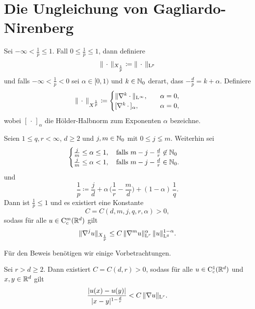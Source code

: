 \chapter{Die Ungleichung von Gagliardo-Nirenberg}

\begin{ntion}
  Sei $-\infty < \frac{1}{p} \leq 1$.
  Fall $0 \leq \frac{1}{p} \leq 1$, dann definiere
  $$
  \| \,\cdot\, \|_{X_{\frac{1}{p}}} \coloneqq \| \,\cdot\, \|_{\mathrm{L}^p}
  $$
  und falls $-\infty < \frac{1}{p} < 0$ sei $\alpha \in [0,1)$ und $k \in \mathbb{N}_0$ derart, dass $-\frac{d}{p} = k + \alpha$. Definiere
  $$
  \| \,\cdot\, \|_{X^{\frac{1}{p}}} \coloneqq 
  \begin{cases} 
    \| \nabla^k \cdot \|_{\mathrm{L}^\infty}, \quad &\alpha = 0, \\ [ \nabla^k \, \cdot \, ]_\alpha, \quad &\alpha = 0,
  \end{cases}
  $$
  wobei $[\,\cdot\,]_\alpha$ die Hölder-Halbnorm zum Exponenten $\alpha$ bezeichne.
\end{ntion}

\begin{hsatz}
  \label{hsatz:gagliardoNirenberg}
  Seien $1 \leq q,r < \infty$, $d \geq 2$ und $j,m \in \mathbb{N}_0$ mit $0 \leq j \lneq m$.
  Weiterhin sei
  $$
  \begin{cases}
    \frac{j}{m} \leq \alpha \leq 1, \quad \text{falls } m - j - \frac{d}{r} \not\in \mathbb{N}_0 \\
    \frac{j}{m} \leq \alpha < 1, \quad \text{falls } m - j - \frac{d}{r} \in \mathbb{N}_0.
  \end{cases}
    $$
    und
    $$
    \frac{1}{p} \coloneqq \frac{j}{d} + \alpha\, \Big( \frac{1}{r} - \frac{m}{d} \Big) + (1 - \alpha) \, \frac{1}{q}.
    $$
    Dann ist $\frac{1}{p} \leq 1$ und es existiert eine Konstante
    $$
    C = C(d,m,j,q,r,\alpha) > 0,
    $$
    sodass für alle $u \in \mathrm{C}_c^m(\mathbb{R}^d)$ gilt
    $$
    \| \nabla^j u\|_{X_{\frac{1}{p}}} \leq C \, \|\nabla^m u\|_{\mathrm{L}^r}^\alpha \, \|u\|_{\mathrm{L}^q}^{1 - \alpha}.
    $$
\end{hsatz}

Für den Beweis benötigen wir einige Vorbetrachtungen.

\begin{lem}
  Sei $r > d \geq 2$.
  Dann existiert $C = C(d,r) > 0$, sodass für alle $u \in \mathrm{C}_c^1(\mathbb{R}^d)$ und $x,y \in \mathbb{R}^d$ gilt
  $$
  \frac{\left| u(x) - u(y) \right|}{|x - y|^{1 - \frac{d}{r}}} < C \, \|\nabla u\|_{\mathrm{L}^r}.
  $$
\end{lem}

